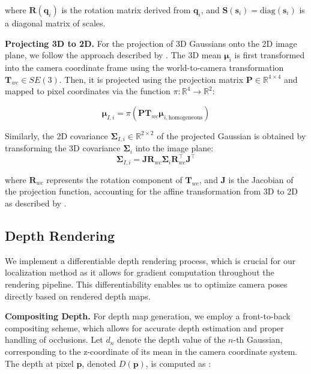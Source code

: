 \documentclass[twocolumn]{article} %
\begin{document}
where \(\mathbf{R}(\mathbf{q}_i)\) is the rotation matrix derived from
\(\mathbf{q}_i\), and
\(\mathbf{S}(\mathbf{s}_i) = \text{diag}(\mathbf{s}_i)\) is a diagonal
matrix of scales.

\textbf{Projecting 3D to 2D.} For the projection of 3D Gaussians onto
the 2D image plane, we follow the approach described by
\cite{kerbl3DGaussianSplatting2023}. The 3D mean
\(\boldsymbol{\mu}_i\) is first transformed into the camera coordinate
frame using the world-to-camera transformation
\(\mathbf{T}_{wc} \in SE(3)\). Then, it is projected using the
projection matrix \(\mathbf{P} \in \mathbb{R}^{4 \times 4}\) and mapped
to pixel coordinates via the function
\(\pi: \mathbb{R}^4 \rightarrow \mathbb{R}^2\):

\[
\boldsymbol{\mu}_{I,i} = \pi\left( \mathbf{P} \mathbf{T}_{wc} \boldsymbol{\mu}_{i,\text{homogeneous}} \right)
\]

Similarly, the 2D covariance
\(\boldsymbol{\Sigma}_{I,i} \in \mathbb{R}^{2\times2}\) of the projected
Gaussian is obtained by transforming the 3D covariance
\(\boldsymbol{\Sigma}_i\) into the image plane: \[
\boldsymbol{\Sigma}_{I,i} = \mathbf{J} \mathbf{R}_{wc} \boldsymbol{\Sigma}_i \mathbf{R}_{wc}^\top \mathbf{J}^\top
\]

where \(\mathbf{R}_{wc}\) represents the rotation component of
\(\mathbf{T}_{wc}\), and \(\mathbf{J}\) is the Jacobian of the
projection function, accounting for the affine transformation from 3D to
2D as described by \cite{zwickerEWASplatting2002}.

\subsection{Depth Rendering}\label{depth-rendering}

We implement a differentiable depth rendering process, which is crucial
for our localization method as it allows for gradient computation
throughout the rendering pipeline. This differentiability enables us to
optimize camera poses directly based on rendered depth maps.

\textbf{Compositing Depth.} For depth map generation, we employ a
front-to-back compositing scheme, which allows for accurate depth
estimation and proper handling of occlusions. Let \(d_n\) denote the
depth value of the \(n\)-th Gaussian, corresponding to the z-coordinate
of its mean in the camera coordinate system. The depth at pixel
\(\mathbf{p}\), denoted \(D(\mathbf{p})\), is computed as
\cite{kerbl3DGaussianSplatting2023}:
\end{document}
